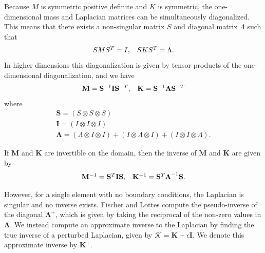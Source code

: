 Because $M$ is symmetric positive definite and $K$ is symmetric, the one-dimensional mass and Laplacian matrices can be simultaneously diagonalized.
This means that there exists a non-singular matrix $S$ and diagonal matrix $\Lambda$ such that
\begin{equation}
\begin{array}{c c}
S M S^T = I,  &  S K S^T = \Lambda.
\end{array}
\end{equation}
In higher dimensions this diagonalization is given by tensor products of the one-dimensional diagonalization, and we have
\begin{equation}
\begin{array}{c c}
\mathbf{M}   = \mathbf{S}^{-1} \mathbf{I} \mathbf{S}^{-T},  &  \mathbf{K} = \mathbf{S}^{-1} \boldsymbol{\Lambda} \mathbf{S}^{-T}  \\
\end{array}
\end{equation}
where
\begin{equation}
\begin{array}{c}
\mathbf{S}       = \left( S \otimes S \otimes S \right)  \\
\mathbf{I}       = \left( I \otimes I \otimes I \right)  \\
\boldsymbol{\Lambda} = \left( \Lambda \otimes I \otimes I \right) + \left( I \otimes \Lambda \otimes I \right) + \left( I \otimes I \otimes \Lambda \right).
\end{array}
\end{equation}

If $\mathbf{M}$ and $\mathbf{K}$ are invertible on the domain, then the inverse of $\mathbf{M}$ and $\mathbf{K}$ are given by
\begin{equation}
\begin{array}{c c}
\mathbf{M}^{-1} = \mathbf{S}^T \mathbf{I} \mathbf{S},  &  \mathbf{K}^{-1} = \mathbf{S}^T \boldsymbol{\Lambda}^{-1} \mathbf{S}.
\end{array}
\end{equation}

However, for a single element with no boundary conditions, the Laplacian is singular and no inverse exists.
Fischer and Lottes \cite{fischer2005hybrid} compute the pseudo-inverse of the diagonal $\boldsymbol{\Lambda}^{+}$, which is given by taking the reciprocal of the non-zero values in $\boldsymbol{\Lambda}$.
We instead compute an approximate inverse to the Laplacian by finding the true inverse of a perturbed Laplacian, given by $\boldsymbol{\mathcal{K}} = \mathbf{K} + \epsilon \mathbf{I}$.
We denote this approximate inverse by $\mathbf{K}^+$.

